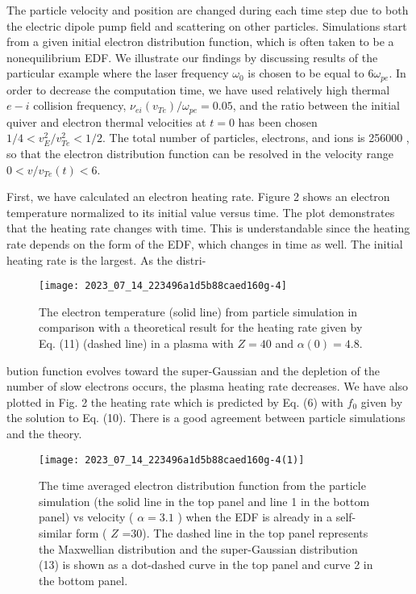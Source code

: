 \documentclass[oneside,onecolumn]{article}
\begin{document}
\begin{sloppypar}
 The particle velocity and position are changed during each time step due to both the electric dipole pump field and scattering on other particles. Simulations start from a given initial electron distribution function, which is often taken to be a nonequilibrium EDF. We illustrate our findings by discussing results of the particular example where the laser frequency $\omega_{0}$ is chosen to be equal to $6 \omega_{p e}$. In order to decrease the computation time, we have used relatively high thermal $e-i$ collision frequency, $\nu_{e i}\left(v_{T e}\right) / \omega_{p e}=0.05$, and the ratio between the initial quiver and electron thermal velocities at $t=0$ has been chosen $1 / 4<v_{E}^{2} / v_{T e}^{2}<1 / 2$. The total number of particles, electrons, and ions is 256000 , so that the electron distribution function can be resolved in the velocity range $0<v / v_{T e}(t)<6$.
 
 First, we have calculated an electron heating rate. Figure 2 shows an electron temperature normalized to its initial value versus time. The plot demonstrates that the heating rate changes with time. This is understandable since the heating rate depends on the form of the EDF, which changes in time as well. The initial heating rate is the largest. As the distri-
 
 \begin{figure}[tbp]
 	\centering
 	\texttt{[image: 2023\_07\_14\_223496a1d5b88caed160g-4]}
 	\caption{The electron temperature (solid line) from particle simulation in comparison with a theoretical result for the heating rate given by Eq. (11) (dashed line) in a plasma with $Z=40$ and $\alpha(0)=4.8$.}
 	\label{fig2.}
 \end{figure}
 
 bution function evolves toward the super-Gaussian and the depletion of the number of slow electrons occurs, the plasma heating rate decreases. We have also plotted in Fig. 2 the heating rate which is predicted by Eq. (6) with $f_{0}$ given by the solution to Eq. (10). There is a good agreement between particle simulations and the theory.
 
 \begin{figure}[tbp]
 	\centering
 	\texttt{[image: 2023\_07\_14\_223496a1d5b88caed160g-4(1)]}
 	\caption{The time averaged electron distribution function from the particle simulation (the solid line in the top panel and line 1 in the bottom panel) vs velocity ( $\alpha=3.1$ ) when the EDF is already in a self-similar form ( $Z$ =30). The dashed line in the top panel represents the Maxwellian distribution and the super-Gaussian distribution (13) is shown as a dot-dashed curve in the top panel and curve 2 in the bottom panel.}
 	\label{fig3.}
 \end{figure}
 

\end{sloppypar}
\end{document}
